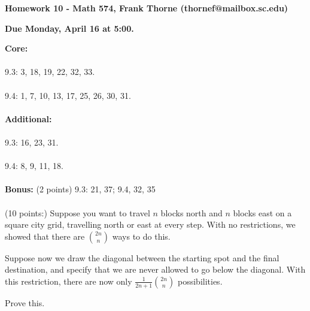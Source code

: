 \documentclass[12pt]{amsart}
\begin{document}
\setlength{\topmargin}{-2mm}





\begin{center}{\bf Homework 10 - Math 574, Frank Thorne (thornef@mailbox.sc.edu)}
\end{center}
\begin{center}
{\bf Due Monday, April 16 at 5:00.}
\end{center}
{\bf Core:}
\\
\\
9.3: 3, 18, 19, 22, 32, 33.
\\
\\
9.4: 1, 7, 10, 13, 17, 25, 26, 30, 31.
\\
\\
{\bf Additional:}
\\
\\
9.3: 16, 23, 31.
\\
\\
9.4: 8, 9, 11, 18.
\\
\\
{\bf Bonus:} 
(2 points) 9.3: 21, 37; 9.4, 32, 35
\\
\\
(10 points:) Suppose you want to travel $n$ blocks north and $n$ blocks east on a square city
grid, travelling north or east at every step. With no restrictions, we showed that 
there are ${2n \choose n}$ ways to do this.

Suppose now we draw the diagonal between the starting spot and the final destination, and specify
that we are never allowed to go below the diagonal. With this restriction, there are now only
$\frac{1}{2n + 1} {2n \choose n}$ possibilities.

Prove this.
\end{document}
